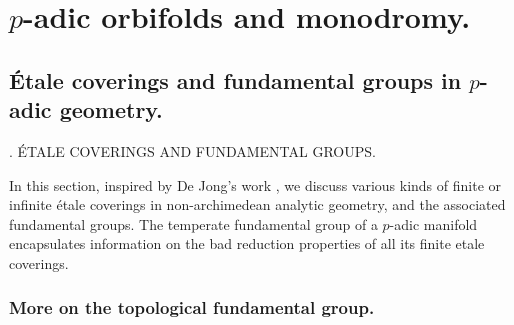 \chapter{$p$-adic orbifolds and monodromy.}
\minitoc
\newpage

\section{\'Etale coverings and fundamental groups in $p$-adic geometry.}
\label{sec::1}

%
{\thesection. \'ETALE COVERINGS AND FUNDAMENTAL GROUPS.}

\begin{abst}
 In this section, inspired by De Jong's work \cite{efgonas}, we discuss various
 kinds of finite or infinite \'etale coverings in non-archimedean
 analytic geometry, and the associated fundamental groups.
 The temperate fundamental group of a $p$-adic manifold encapsulates
 information on the bad reduction properties of all its finite etale
 coverings.
\end{abst}
   

\subsection{More on the topological fundamental group.}\label{sub::1.1} 

